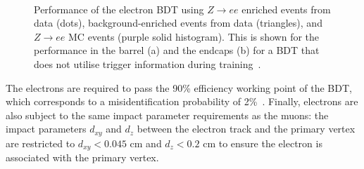 \begin{figure}[t]
\centering
     \\
\caption{Performance of the electron BDT using $Z\rightarrow ee$ enriched events from data (dots), background-enriched events from data (triangles), and $Z\rightarrow ee$ MC events (purple solid histogram). This is shown for the performance in the barrel (a) and the endcaps (b) for a BDT that does not utilise trigger information during training~\cite{CMS:2015xaf}.}
\label{fig:electron_eff}
\end{figure}

The electrons are required to pass the 90\% efficiency working point of the \ac{BDT}, which corresponds to a misidentification probability of 2\%~\cite{CMS:2015xaf}. 
Finally, electrons are also subject to the same impact parameter requirements as the muons: the impact parameters $d_{xy}$ and $d_{z}$ between the electron track and the primary vertex are restricted to $d_{xy}<0.045$ cm and $d_{z}<0.2$ cm to ensure the electron is associated with the primary vertex. \\

